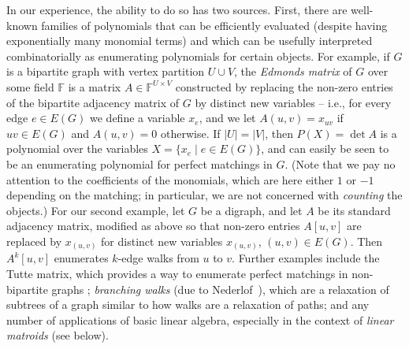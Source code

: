 \documentclass[10pt,a4paper]{article}
\newcommand{\F}{\ensuremath{\mathbb F}\xspace}
\begin{document}
In our experience, the ability to do so has two sources. First, there are
well-known families of polynomials that can be efficiently evaluated
(despite having exponentially many monomial terms) and which can be
usefully interpreted combinatorially as enumerating polynomials for
certain objects. For example, if $G$ is a bipartite graph with vertex
partition $U \cup V$, the \emph{Edmonds matrix} of $G$ over some field $\F$ 
is a matrix $A \in \F^{U \times V}$ constructed by replacing
the non-zero entries of the bipartite adjacency matrix of $G$ by
distinct new variables -- i.e., for every edge $e \in E(G)$ we define
a variable $x_e$, and we let $A(u,v)=x_{uv}$ if $uv \in E(G)$ and
$A(u,v)=0$ otherwise. If $|U|=|V|$, then $P(X)=\det A$ is a polynomial
over the variables $X=\{x_e \mid e \in E(G)\}$, and can easily be seen
to be an enumerating polynomial for perfect matchings in $G$.
(Note that we pay no attention to the coefficients of the monomials,
which are here either $1$ or $-1$ depending on the matching; in
particular, we are not concerned with \emph{counting} the objects.)
For our second example, let $G$ be a digraph, and let $A$ be its
standard adjacency matrix, modified as above so that
non-zero entries $A[u,v]$ are replaced by $x_{(u,v)}$
for distinct new variables $x_{(u,v)}$, $(u,v) \in E(G)$.
Then $A^k[u,v]$ enumerates $k$-edge walks from $u$ to $v$.
Further examples include the Tutte matrix, which provides a
way to enumerate perfect matchings in non-bipartite graphs \cite{Tutte47};
\emph{branching walks} (due to Nederlof~\cite{Nederlof13algorithmica}), which are
a relaxation of subtrees of a graph similar to how walks are a
relaxation of paths; and any number of applications of basic linear
algebra, especially in the context of \emph{linear matroids} (see below). 
\end{document}

